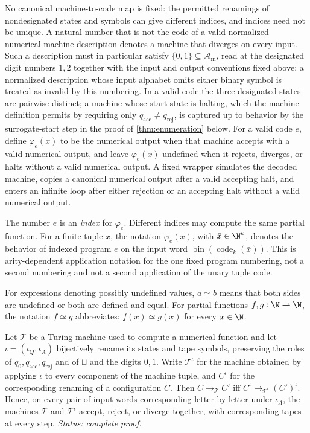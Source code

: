 No canonical machine-to-code map is fixed: the permitted renamings of
nondesignated states and symbols can give different indices, and indices
need not be unique.  A natural number that is not the code of a
valid normalized numerical-machine description denotes a machine that
diverges on every input.  Such a description must in particular satisfy
\(\{0,1\}\subseteq\mathcal A_{\mathrm{in}}\), read at the designated digit
numbers \(1,2\) together with the input and output conventions fixed
above; a normalized description whose input alphabet omits either binary
symbol is treated as invalid by this numbering.  In a valid code the three
designated states are pairwise distinct; a machine whose start state is
halting, which the machine definition permits by requiring only
\(q_{\mathrm{acc}}\neq q_{\mathrm{rej}}\), is captured up to behavior by
the surrogate-start step in the proof of \cref{thm:enumeration} below.
For a valid code \(e\), define
\(\varphi_e(x)\) to be the numerical output when that machine accepts with a
valid numerical output, and leave \(\varphi_e(x)\) undefined when it rejects,
diverges, or halts without a valid numerical output.  A fixed wrapper simulates the decoded
machine, copies a canonical numerical output after a valid accepting halt, and
enters an infinite loop after either rejection or an accepting halt without a
valid numerical output.

The number \(e\) is an \emph{index} for \(\varphi_e\).  Different indices may
compute the same partial function.  For a finite tuple \(\bar x\), the notation
\(\varphi_e(\bar x)\), with \(\bar x\in\N^k\), denotes the behavior of indexed
program \(e\) on the input word
\(\operatorname{bin}(\operatorname{code}_k(\bar x))\).  This is
arity-dependent application notation for the one fixed program numbering, not
a second numbering and not a second application of the unary tuple code.

For expressions denoting possibly undefined values, \(a\simeq b\) means that
both sides are undefined or both are defined and equal.  For partial
functions \(f,g:\N\rightharpoonup\N\), the notation \(f\simeq g\)
abbreviates: \(f(x)\simeq g(x)\) for every \(x\in\N\).

\begin{lemma}
\label{lem:renaming-invariance}
Let \(\mathcal T\) be a Turing machine used to compute a numerical function
and let \(\iota=(\iota_Q,\iota_A)\) bijectively rename its states and tape
symbols, preserving the roles of
\(q_0,q_{\mathrm{acc}},q_{\mathrm{rej}}\) and of \(\sqcup\) and the digits
\(0,1\).  Write \(\mathcal T^{\iota}\) for the machine obtained by applying
\(\iota\) to every component of the machine tuple, and \(C^{\iota}\) for the
corresponding renaming of a configuration \(C\).  Then
\(C\longrightarrow_{\mathcal T}C'\) iff
\(C^{\iota}\longrightarrow_{\mathcal T^{\iota}}(C')^{\iota}\).  Hence, on
every pair of input words corresponding letter by letter under \(\iota_A\),
the machines \(\mathcal T\) and \(\mathcal T^{\iota}\) accept, reject, or
diverge together, with corresponding tapes at every step.
\textit{Status: complete proof.}
\end{lemma}

